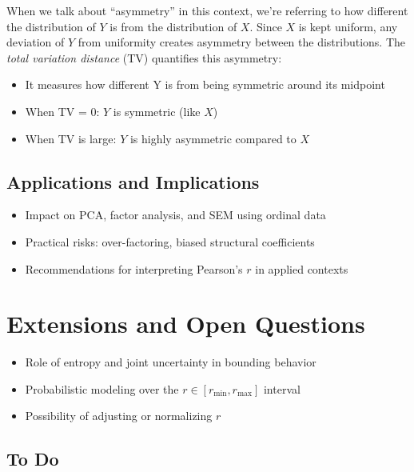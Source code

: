 \documentclass[
  12pt,
]{article}
\providecommand{\tightlist}{%
  \setlength{\itemsep}{0pt}\setlength{\parskip}{0pt}}\usepackage{longtable,booktabs,array}
\theoremstyle{plain}
\theoremstyle{definition}
\theoremstyle{remark}
\begin{document}
When we talk about ``asymmetry'' in this context, we're referring to how
different the distribution of \(Y\) is from the distribution of \(X\).
Since \(X\) is kept uniform, any deviation of \(Y\) from uniformity
creates asymmetry between the distributions. The \emph{total variation
distance} (TV) quantifies this asymmetry:

\begin{itemize}
\tightlist
\item
  It measures how different Y is from being symmetric around its
  midpoint
\item
  When TV = 0: \(Y\) is symmetric (like \(X\))
\item
  When TV is large: \(Y\) is highly asymmetric compared to \(X\)
\end{itemize}

\subsection{Applications and
Implications}\label{applications-and-implications}

\begin{itemize}
\tightlist
\item
  Impact on PCA, factor analysis, and SEM using ordinal data\\
\item
  Practical risks: over-factoring, biased structural coefficients\\
\item
  Recommendations for interpreting Pearson's \(r\) in applied contexts
\end{itemize}

\section{Extensions and Open
Questions}\label{extensions-and-open-questions}

\begin{itemize}
\tightlist
\item
  Role of entropy and joint uncertainty in bounding behavior\\
\item
  Probabilistic modeling over the \(r \in [r_{\min}, r_{\max}]\)
  interval\\
\item
  Possibility of adjusting or normalizing \(r\)
\end{itemize}

\subsection{To Do}\label{to-do}
\end{document}
